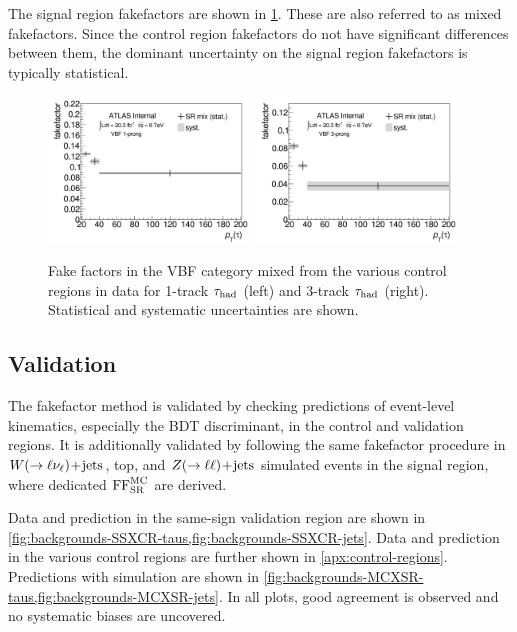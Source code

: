 The signal region fakefactors are shown in \cref{fig:backgrounds-fakefactorsVBFmix}. These are also referred to as mixed fakefactors. Since the control region fakefactors do not have significant differences between them, the dominant uncertainty on the signal region fakefactors is typically statistical.

\begin{figure}[tp]
  \centering
  \includegraphics[width=0.48\textwidth]{figures/backgrounds/fakefactor_8TeV_vbf_1p_mix}
  \includegraphics[width=0.48\textwidth]{figures/backgrounds/fakefactor_8TeV_vbf_3p_mix}
  \caption{Fake factors in the VBF category mixed from the various control regions in data for 1-track $\tau_\text{had}$ (left) and 3-track $\tau_\text{had}$ (right). Statistical and systematic uncertainties are shown.}
  \label{fig:backgrounds-fakefactorsVBFmix}
\end{figure}

\clearpage

\subsection{Validation}

The fakefactor method is validated by checking predictions of event-level kinematics, especially the BDT discriminant, in the control and validation regions. It is additionally validated by following the same fakefactor procedure in $W (\rightarrow \ell\nu_\ell)\!+\!\text{jets}$, top, and $Z (\rightarrow \ell\ell)\!+\!\text{jets}$ simulated events in the signal region, where dedicated $\text{FF}_\text{SR}^\text{MC}$ are derived.

Data and prediction in the same-sign validation region are shown in \cref{fig:backgrounds-SSXCR-taus,fig:backgrounds-SSXCR-jets}. Data and prediction in the various control regions are further shown in \cref{apx:control-regions}. Predictions with simulation are shown in \cref{fig:backgrounds-MCXSR-taus,fig:backgrounds-MCXSR-jets}. In all plots, good agreement is observed and no systematic biases are uncovered.

